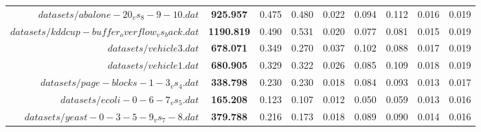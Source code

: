 \begin{table}[!ht]
{\begin{tabular}{r c c c c c c c c}
$datasets/abalone-20_vs_8-9-10.dat$ & \textbf{925.957} & 0.475 & 0.480 & 0.022 & 0.094 & 0.112 & 0.016 & 0.019 \\
$datasets/kddcup-buffer_overflow_vs_back.dat$ & \textbf{1190.819} & 0.490 & 0.531 & 0.020 & 0.077 & 0.081 & 0.015 & 0.019 \\
$datasets/vehicle3.dat$ & \textbf{678.071} & 0.349 & 0.270 & 0.037 & 0.102 & 0.088 & 0.017 & 0.019 \\
$datasets/vehicle1.dat$ & \textbf{680.905} & 0.329 & 0.322 & 0.026 & 0.085 & 0.109 & 0.018 & 0.019 \\
$datasets/page-blocks-1-3_vs_4.dat$ & \textbf{338.798} & 0.230 & 0.230 & 0.018 & 0.084 & 0.093 & 0.013 & 0.017 \\
$datasets/ecoli-0-6-7_vs_5.dat$ & \textbf{165.208} & 0.123 & 0.107 & 0.012 & 0.050 & 0.059 & 0.013 & 0.016 \\
$datasets/yeast-0-3-5-9_vs_7-8.dat$ & \textbf{379.788} & 0.216 & 0.173 & 0.018 & 0.089 & 0.090 & 0.014 & 0.016 \\
\end{tabular}}
\end{table}
